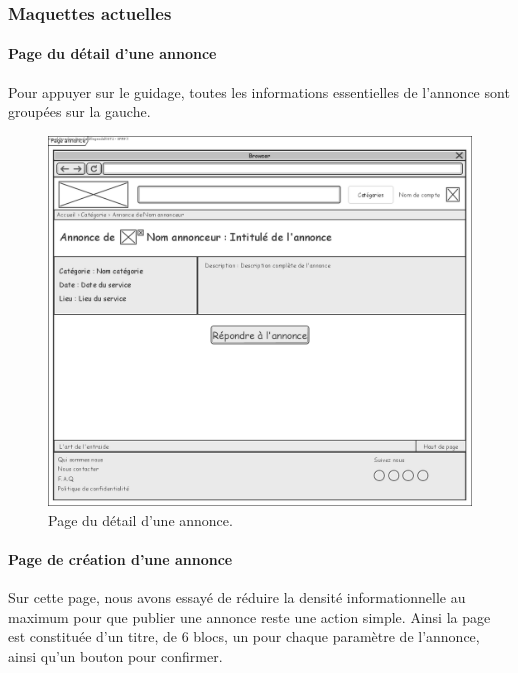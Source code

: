 \documentclass[a4paper,11pt]{article}
\begin{document}
\subsubsection{Maquettes actuelles}

\paragraph{Page du détail d'une annonce}

Pour appuyer sur le guidage, toutes les informations essentielles de l'annonce sont groupées sur la gauche.


\begin{figure}[H]
  \includegraphics[width=\linewidth]{../Conception/maquette/maquette-detail-annonce.png}
  \caption{Page du détail d'une annonce.}
  \label{fig:maquette-detail-annonce}
\end{figure}
\newpage

\paragraph{Page de création d'une annonce}

Sur cette page, nous avons essayé de réduire la densité informationnelle au maximum pour que publier
une annonce reste une action simple. Ainsi la page est constituée d'un titre, de 6 blocs, un pour chaque paramètre
de l'annonce, ainsi qu'un bouton pour confirmer.
\end{document}
